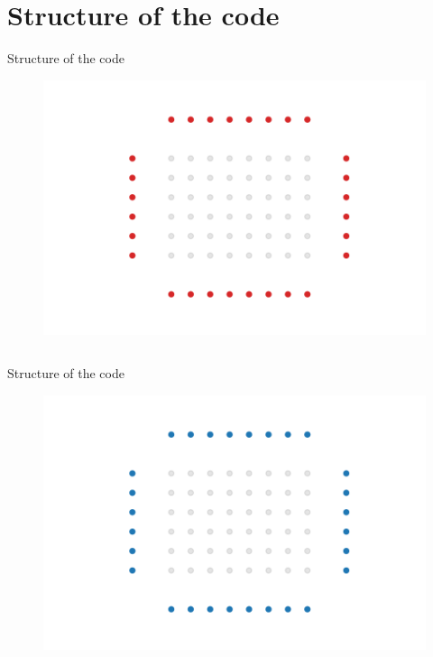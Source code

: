 \documentclass[aspectratio=169]{beamer}
\begin{document}
\section{Structure of the code}
\begin{frame}{Structure of the code}
    \vspace{-0.8cm}
    \begin{figure}
        \centering
        \includegraphics[width=0.8\linewidth]{Figures/step0.pdf}
    \end{figure}
    \vspace{-1.2cm}
    \inputminted[firstline=2, lastline=2,tabsize=4,fontsize=\footnotesize,framesep=2mm,bgcolor=codebgcolor,breaklines,linenos]{c}{../core.c}
\end{frame}


\begin{frame}{Structure of the code}
    \vspace{-0.8cm}
    \begin{figure}
        \centering
        \includegraphics[width=0.8\linewidth]{Figures/step1.pdf}
    \end{figure}
    \vspace{-1.2cm}
    \inputminted[firstline=3, lastline=3,tabsize=4,fontsize=\footnotesize,framesep=2mm,bgcolor=codebgcolor,breaklines,linenos]{c}{../core.c}
\end{frame}
\end{document}
